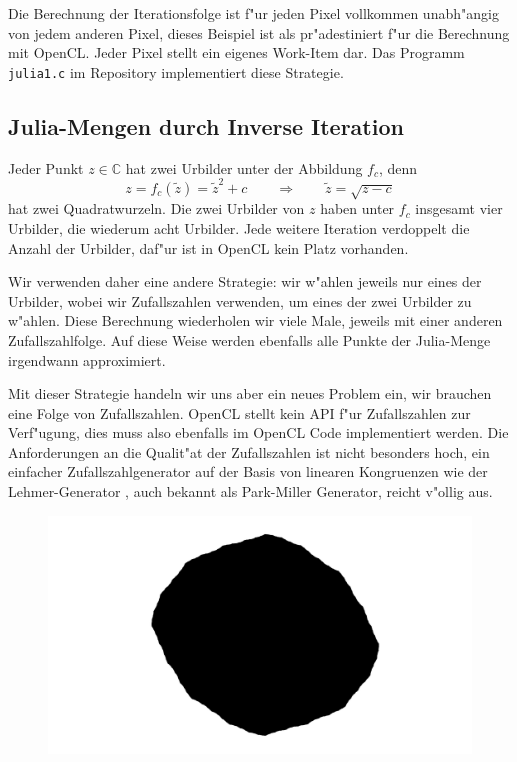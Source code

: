 \begin{refsection}
Die Berechnung der Iterationsfolge ist f"ur jeden Pixel vollkommen
unabh"angig von jedem anderen Pixel, dieses Beispiel ist als pr"adestiniert
f"ur die Berechnung mit OpenCL.
Jeder Pixel stellt ein eigenes Work-Item dar.
Das Programm {\tt julia1.c} im Repository implementiert diese Strategie.


\subsection{Julia-Mengen durch Inverse Iteration}
Jeder Punkt $z\in\mathbb C$ hat zwei Urbilder unter der Abbildung $f_c$,
denn
\[
z=f_c(\tilde z)=\tilde z^2+c
\qquad\Rightarrow\qquad
\tilde z=\sqrt{z-c}
\]
hat zwei Quadratwurzeln. 
Die zwei Urbilder von $z$ haben unter $f_c$ insgesamt vier Urbilder, 
die wiederum acht Urbilder.
Jede weitere Iteration verdoppelt die Anzahl der Urbilder, daf"ur ist
in OpenCL kein Platz vorhanden.

Wir verwenden daher eine andere Strategie: wir w"ahlen jeweils nur eines
der Urbilder, wobei wir Zufallszahlen verwenden, um eines der zwei
Urbilder zu w"ahlen.
Diese Berechnung wiederholen wir viele Male, jeweils mit einer anderen
Zufallszahlfolge.
Auf diese Weise werden ebenfalls alle Punkte der Julia-Menge irgendwann
approximiert.

Mit dieser Strategie handeln wir uns aber ein neues Problem ein, wir brauchen
eine Folge von Zufallszahlen.
OpenCL stellt kein API f"ur Zufallszahlen zur Verf"ugung, dies muss also
ebenfalls im OpenCL Code implementiert werden.
Die Anforderungen an die Qualit"at der Zufallszahlen ist nicht besonders
hoch, ein einfacher Zufallszahlgenerator auf der Basis von linearen
Kongruenzen wie der Lehmer-Generator \cite{julia:lehmer},
auch bekannt als Park-Miller Generator, reicht v"ollig aus.

\begin{figure}
\begin{center}
\includegraphics[width=\hsize]{julia/a.png}


\end{center}
\end{figure}
\end{refsection}

